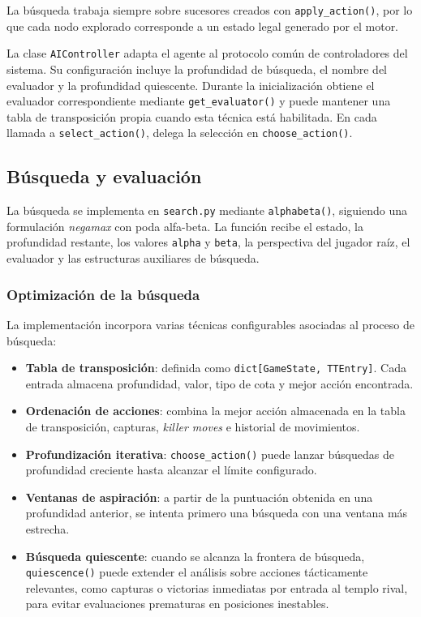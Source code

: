 La búsqueda trabaja siempre sobre sucesores creados con \texttt{apply\_action()}, por lo que cada nodo explorado corresponde a un estado legal generado por el motor.

La clase \texttt{AIController} adapta el agente al protocolo común de controladores del sistema. Su configuración incluye la profundidad de búsqueda, el nombre del evaluador y la profundidad quiescente. Durante la inicialización obtiene el evaluador correspondiente mediante \texttt{get\_evaluator()} y puede mantener una tabla de transposición propia cuando esta técnica está habilitada. En cada llamada a \texttt{select\_action()}, delega la selección en \texttt{choose\_action()}.

\subsection{Búsqueda y evaluación}
\label{subsec:busqueda-evaluacion-ia}

La búsqueda se implementa en \texttt{search.py} mediante \texttt{alphabeta()}, siguiendo una formulación \textit{negamax} con poda alfa-beta. La función recibe el estado, la profundidad restante, los valores \texttt{alpha} y \texttt{beta}, la perspectiva del jugador raíz, el evaluador y las estructuras auxiliares de búsqueda.

\subsubsection{Optimización de la búsqueda}

La implementación incorpora varias técnicas configurables asociadas al proceso de búsqueda:
\begin{itemize}
    \item \textbf{Tabla de transposición}: definida como \texttt{dict[GameState, TTEntry]}. Cada entrada almacena profundidad, valor, tipo de cota y mejor acción encontrada.
    \item \textbf{Ordenación de acciones}: combina la mejor acción almacenada en la tabla de transposición, capturas, \textit{killer moves} e historial de movimientos.
    \item \textbf{Profundización iterativa}: \texttt{choose\_action()} puede lanzar búsquedas de profundidad creciente hasta alcanzar el límite configurado.
    \item \textbf{Ventanas de aspiración}: a partir de la puntuación obtenida en una profundidad anterior, se intenta primero una búsqueda con una ventana más estrecha.
    \item \textbf{Búsqueda quiescente}: cuando se alcanza la frontera de búsqueda, \texttt{quiescence()} puede extender el análisis sobre acciones tácticamente relevantes, como capturas o victorias inmediatas por entrada al templo rival, para evitar evaluaciones prematuras en posiciones inestables.
\end{itemize}

